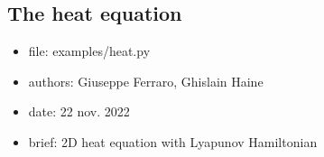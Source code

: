 \documentclass[letterpaper,10pt,english]{sphinxmanual}
\begin{document}
\sphinxstepscope


\subsection{The heat equation}
\label{\detokenize{examples/heat:the-heat-equation}}\label{\detokenize{examples/heat::doc}}\label{\detokenize{examples/heat:heat-2d}}\label{\detokenize{examples/heat:module-examples.heat}}\begin{itemize}
\item {} 
\sphinxAtStartPar
file:             examples/heat.py

\item {} 
\sphinxAtStartPar
authors:          Giuseppe Ferraro, Ghislain Haine

\item {} 
\sphinxAtStartPar
date:             22 nov. 2022

\item {} 
\sphinxAtStartPar
brief:            2D heat equation with Lyapunov Hamiltonian

\end{itemize}
\end{document}
